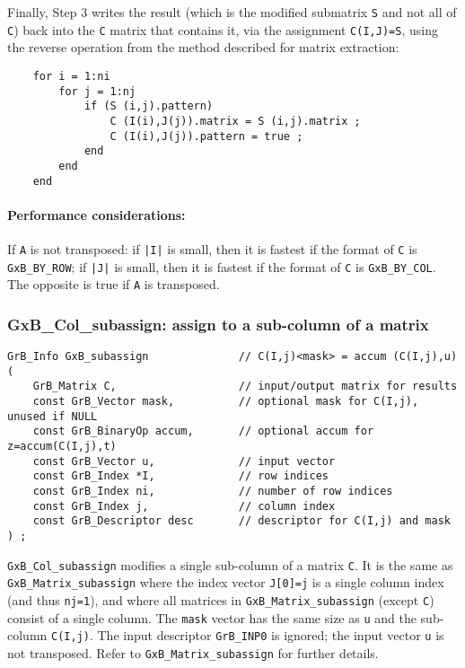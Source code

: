 \documentclass[12pt]{article}
\begin{document}
{Finally, Step 3 writes the result (which is the modified submatrix \verb'S' and
not all of \verb'C') back into the \verb'C' matrix that contains it, via the
assignment \verb'C(I,J)=S', using the reverse operation from the method
described for matrix extraction:

    {\footnotesize
    \begin{verbatim}
    for i = 1:ni
        for j = 1:nj
            if (S (i,j).pattern)
                C (I(i),J(j)).matrix = S (i,j).matrix ;
                C (I(i),J(j)).pattern = true ;
            end
        end
    end \end{verbatim}}

\paragraph{\bf Performance considerations:} %
If \verb'A' is not transposed: if \verb'|I|' is small, then it is fastest if
the format of \verb'C' is \verb'GxB_BY_ROW'; if \verb'|J|' is small, then it is
fastest if the format of \verb'C' is \verb'GxB_BY_COL'.  The opposite is true
if \verb'A' is transposed.

\newpage
\subsubsection{{\sf GxB\_Col\_subassign:} assign to a sub-column of a matrix}
\label{subassign_column}

\begin{mdframed}[userdefinedwidth=6in]
{\footnotesize
\begin{verbatim}
GrB_Info GxB_subassign              // C(I,j)<mask> = accum (C(I,j),u)
(
    GrB_Matrix C,                   // input/output matrix for results
    const GrB_Vector mask,          // optional mask for C(I,j), unused if NULL
    const GrB_BinaryOp accum,       // optional accum for z=accum(C(I,j),t)
    const GrB_Vector u,             // input vector
    const GrB_Index *I,             // row indices
    const GrB_Index ni,             // number of row indices
    const GrB_Index j,              // column index
    const GrB_Descriptor desc       // descriptor for C(I,j) and mask
) ;
\end{verbatim} } \end{mdframed}

\verb'GxB_Col_subassign' modifies a single sub-column of a matrix \verb'C'.  It
is the same as \verb'GxB_Matrix_subassign' where the index vector \verb'J[0]=j'
is a single column index (and thus \verb'nj=1'), and where all matrices in
\verb'GxB_Matrix_subassign' (except \verb'C') consist of a single column.  The
\verb'mask' vector has the same size as \verb'u' and the sub-column
\verb'C(I,j)'.  The input descriptor \verb'GrB_INP0' is ignored; the input
vector \verb'u' is not transposed.  Refer to \verb'GxB_Matrix_subassign' for
further details.

}
\end{document}

